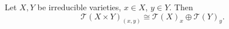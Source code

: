 Let $X, Y$ be irreducible varieties, $x \in X$, $y \in Y$. Then
$$\mathcal{T}(X \times Y)_{(x, y)} \cong \mathcal{T}(X)_x \oplus \mathcal{T}(Y)_y.$$
